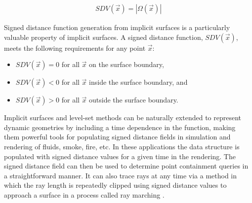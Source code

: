\begin{align} \label{eq:sdf}
   SDV(\vec{x}) = |\Omega(\vec{x})|
\end{align}

Signed distance function generation from implicit surfaces is a
particularly valuable property of implicit surfaces. A signed distance
function, $SDV(\vec{x})$, meets the following requirements
for any point $\vec{x}$:

\begin{itemize}
\item $ SDV(\vec{x}) = 0 $ for all $ \vec{x} $ on the surface boundary,
\item $ SDV(\vec{x}) < 0 $ for all $\vec{x}$ inside the surface boundary, and
\item $ SDV(\vec{x}) > 0 $ for all $\vec{x}$ outside the surface boundary.
\end{itemize}

Implicit surfaces and level-set methods can be naturally extended to
represent dynamic geometries by including a time dependence in the
function, making them powerful tools for populating signed distance
fields in simulation and rendering of fluids, smoke, fire, etc. In
these applications the data structure is populated with signed
distance values for a given time in the rendering. The signed distance
field can then be used to determine point containment queries in a
straightforward manner. It can also trace rays at any time via a
method in which the ray length is repeatedly clipped using signed
distance values to approach a surface in a process called ray marching
\cite{Tomczak_2012}.
